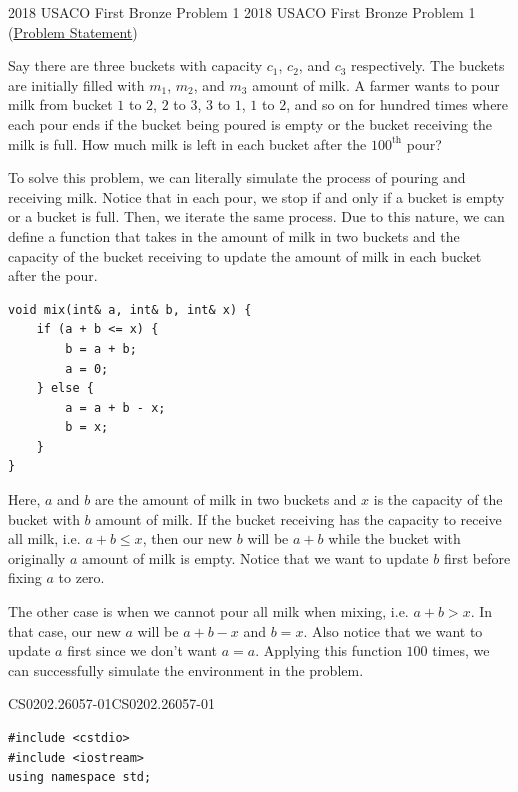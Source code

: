 \documentclass[../../../main.tex]{subfiles}
\begin{document}
\begin{problem}
{2018 USACO First Bronze Problem 1}
{2018 USACO First Bronze Problem 1}
(\href{https://usaco.org/index.php?page=viewproblem2&cpid=855}{Problem Statement})

Say there are three buckets with capacity $c_1$, $c_2$, and $c_3$
respectively. The buckets are initially filled with $m_1$, $m_2$,
and $m_3$ amount of milk. A farmer wants to pour milk from bucket
$1$ to $2$, $2$ to $3$, $3$ to $1$, $1$ to $2$, and so on for
hundred times where each pour ends if the bucket being poured is
empty or the bucket receiving the milk is full. How much milk is
left in each bucket after the $100^\text{th}$ pour?
\end{problem}
\begin{solution}
To solve this problem, we can literally simulate the process of
pouring and receiving milk. Notice that in each pour, we stop
if and only if a bucket is empty or a bucket is full. Then, we
iterate the same process. Due to this nature, we can define a
function that takes in the amount of milk in two buckets and the
capacity of the bucket receiving to update the amount of milk in
each bucket after the pour.

\begin{basicboxSolution}
\begin{lstlisting}[style=basic]
void mix(int& a, int& b, int& x) {
    if (a + b <= x) {
        b = a + b;
        a = 0;
    } else {
        a = a + b - x;
        b = x;
    }
}
\end{lstlisting}
\end{basicboxSolution}

Here, $a$ and $b$ are the amount of milk in two buckets and $x$
is the capacity of the bucket with $b$ amount of milk. If the
bucket receiving has the capacity to receive all milk, i.e.
$a + b \leq x$, then our new $b$ will be $a + b$ while the bucket
with originally $a$ amount of milk is empty. Notice that we want
to update $b$ first before fixing $a$ to zero.

The other case is when we cannot pour all milk when mixing, i.e.
$a + b > x$. In that case, our new $a$ will be $a + b - x$ and
$b = x$. Also notice that we want to update $a$ first since we don't
want $a = a$. Applying this function $100$ times, we can successfully
simulate the environment in the problem.

\begin{cppboxSolution}{CS0202.26057-01}{CS0202.26057-01}
\begin{lstlisting}[style=cppstyle]
#include <cstdio>
#include <iostream>
using namespace std;


\end{lstlisting}
\end{cppboxSolution}
\end{solution}
\end{document}
